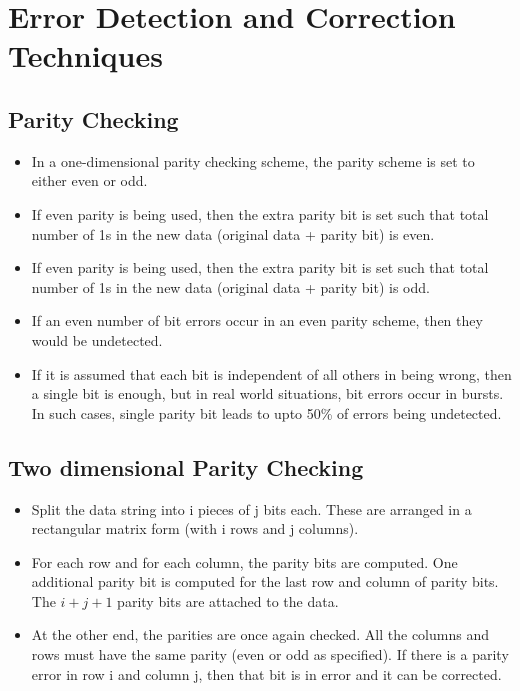 \documentclass[a4paper]{article}
\theoremstyle{plain}
\theoremstyle{definition}
\begin{document}
\section{Error Detection and Correction Techniques}
\subsection{Parity Checking}
\begin{itemize}
    \item In a one-dimensional parity checking scheme, the parity scheme is set to either even or odd. 
    
    \item If even parity is being used, then the extra parity bit is set such that total number of 1s in the new data (original data + parity bit) is even. 
    
    \item If even parity is being used, then the extra parity bit is set such that total number of 1s in the new data (original data + parity bit) is odd.
    
    \item If an even number of bit errors occur in an even parity scheme, then they would be undetected.
    
    \item If it is assumed that each bit is independent of all others in being wrong, then a single bit is enough, but in real world situations, bit errors occur in bursts. In such cases, single parity bit leads to upto 50\% of errors being undetected. 
\end{itemize}

\subsection{Two dimensional Parity Checking}
\begin{itemize}
    \item Split the data string into i pieces of j bits each. These are arranged in a rectangular matrix form (with i rows and j columns). 
    
    \item For each row and for each column, the parity bits are computed. One additional parity bit is computed for the last row and column of parity bits. The $i+j+1$ parity bits are attached to the data. 
    
    \item At the other end, the parities are once again checked. All the columns and rows must have the same parity (even or odd as specified). If there is a parity error in row i and column j, then that bit is in error and it can be corrected. 
\end{itemize}
\end{document}
